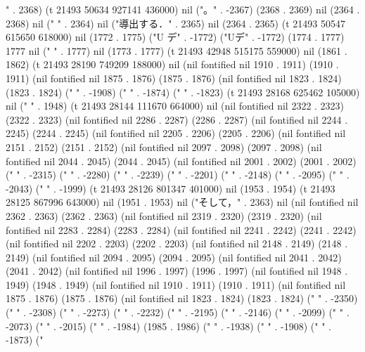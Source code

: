 " . 2368) (t 21493 50634 927141 436000) nil ("。" . -2367) (2368 . 2369) nil (2364 . 2368) nil ("
" . 2364) nil ("導出する．" . 2365) nil (2364 . 2365) (t 21493 50547 615650 618000) nil (1772 . 1775) ("U デ" . -1772) ("Uデ" . -1772) (1774 . 1777) 1777 nil (" " . 1777) nil (1773 . 1777) (t 21493 42948 515175 559000) nil (1861 . 1862) (t 21493 28190 749209 188000) nil (nil fontified nil 1910 . 1911) (1910 . 1911) (nil fontified nil 1875 . 1876) (1875 . 1876) (nil fontified nil 1823 . 1824) (1823 . 1824) ("
" . -1908) ("
" . -1874) ("
" . -1823) (t 21493 28168 625462 105000) nil ("
" . 1948) (t 21493 28144 111670 664000) nil (nil fontified nil 2322 . 2323) (2322 . 2323) (nil fontified nil 2286 . 2287) (2286 . 2287) (nil fontified nil 2244 . 2245) (2244 . 2245) (nil fontified nil 2205 . 2206) (2205 . 2206) (nil fontified nil 2151 . 2152) (2151 . 2152) (nil fontified nil 2097 . 2098) (2097 . 2098) (nil fontified nil 2044 . 2045) (2044 . 2045) (nil fontified nil 2001 . 2002) (2001 . 2002) ("
" . -2315) ("
" . -2280) ("
" . -2239) ("
" . -2201) ("
" . -2148) ("
" . -2095) ("
" . -2043) ("
" . -1999) (t 21493 28126 801347 401000) nil (1953 . 1954) (t 21493 28125 867996 643000) nil (1951 . 1953) nil ("そして，" . 2363) nil (nil fontified nil 2362 . 2363) (2362 . 2363) (nil fontified nil 2319 . 2320) (2319 . 2320) (nil fontified nil 2283 . 2284) (2283 . 2284) (nil fontified nil 2241 . 2242) (2241 . 2242) (nil fontified nil 2202 . 2203) (2202 . 2203) (nil fontified nil 2148 . 2149) (2148 . 2149) (nil fontified nil 2094 . 2095) (2094 . 2095) (nil fontified nil 2041 . 2042) (2041 . 2042) (nil fontified nil 1996 . 1997) (1996 . 1997) (nil fontified nil 1948 . 1949) (1948 . 1949) (nil fontified nil 1910 . 1911) (1910 . 1911) (nil fontified nil 1875 . 1876) (1875 . 1876) (nil fontified nil 1823 . 1824) (1823 . 1824) ("
" . -2350) ("
" . -2308) ("
" . -2273) ("
" . -2232) ("
" . -2195) ("
" . -2146) ("
" . -2099) ("
" . -2073) ("
" . -2015) ("
" . -1984) (1985 . 1986) ("
" . -1938) ("
" . -1908) ("
" . -1873) ("
